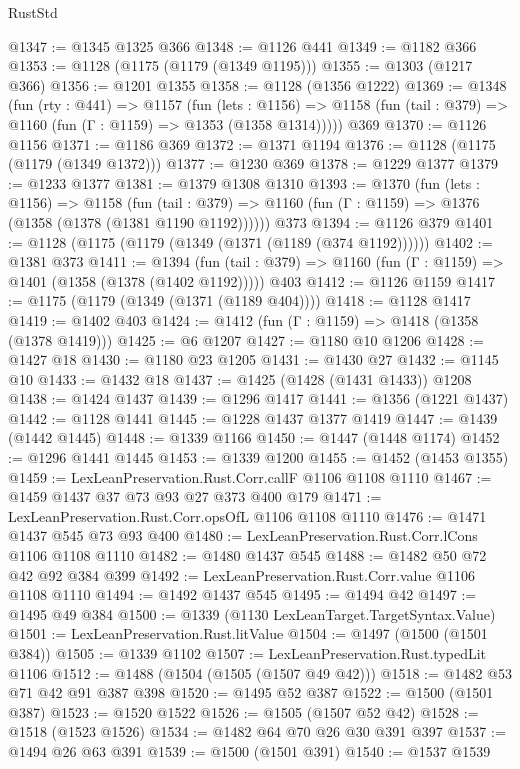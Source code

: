 \begin{lexlean}{RustStd}
\begin{coremodule}
@1347 := @1345 @1325 @366
@1348 := @1126 @441
@1349 := @1182 @366
@1353 := @1128 (@1175 (@1179 (@1349 @1195)))
@1355 := @1303 (@1217 @366)
@1356 := @1201 @1355
@1358 := @1128 (@1356 @1222)
@1369 := @1348
    (fun (rty : @441) =>
    @1157
      (fun (lets : @1156) =>
      @1158 (fun (tail : @379) => @1160 (fun (Γ : @1159) => @1353 (@1358 @1314)))))
    @369
@1370 := @1126 @1156
@1371 := @1186 @369
@1372 := @1371 @1194
@1376 := @1128 (@1175 (@1179 (@1349 @1372)))
@1377 := @1230 @369
@1378 := @1229 @1377
@1379 := @1233 @1377
@1381 := @1379 @1308 @1310
@1393 := @1370
    (fun (lets : @1156) =>
    @1158
      (fun (tail : @379) => @1160 (fun (Γ : @1159) => @1376 (@1358 (@1378 (@1381 @1190 @1192))))))
    @373
@1394 := @1126 @379
@1401 := @1128 (@1175 (@1179 (@1349 (@1371 (@1189 (@374 @1192))))))
@1402 := @1381 @373
@1411 := @1394
    (fun (tail : @379) => @1160 (fun (Γ : @1159) => @1401 (@1358 (@1378 (@1402 @1192)))))
    @403
@1412 := @1126 @1159
@1417 := @1175 (@1179 (@1349 (@1371 (@1189 @404))))
@1418 := @1128 @1417
@1419 := @1402 @403
@1424 := @1412 (fun (Γ : @1159) => @1418 (@1358 (@1378 @1419)))
@1425 := @6 @1207
@1427 := @1180 @10 @1206
@1428 := @1427 @18
@1430 := @1180 @23 @1205
@1431 := @1430 @27
@1432 := @1145 @10
@1433 := @1432 @18
@1437 := @1425 (@1428 (@1431 @1433)) @1208
@1438 := @1424 @1437
@1439 := @1296 @1417
@1441 := @1356 (@1221 @1437)
@1442 := @1128 @1441
@1445 := @1228 @1437 @1377 @1419
@1447 := @1439 (@1442 @1445)
@1448 := @1339 @1166
@1450 := @1447 (@1448 @1174)
@1452 := @1296 @1441 @1445
@1453 := @1339 @1200
@1455 := @1452 (@1453 @1355)
@1459 := LexLeanPreservation.Rust.Corr.callF @1106 @1108 @1110
@1467 := @1459 @1437 @37 @73 @93 @27 @373 @400 @179
@1471 := LexLeanPreservation.Rust.Corr.opsOfL @1106 @1108 @1110
@1476 := @1471 @1437 @545 @73 @93 @400
@1480 := LexLeanPreservation.Rust.Corr.lCons @1106 @1108 @1110
@1482 := @1480 @1437 @545
@1488 := @1482 @50 @72 @42 @92 @384 @399
@1492 := LexLeanPreservation.Rust.Corr.value @1106 @1108 @1110
@1494 := @1492 @1437 @545
@1495 := @1494 @42
@1497 := @1495 @49 @384
@1500 := @1339 (@1130 LexLeanTarget.TargetSyntax.Value)
@1501 := LexLeanPreservation.Rust.litValue
@1504 := @1497 (@1500 (@1501 @384))
@1505 := @1339 @1102
@1507 := LexLeanPreservation.Rust.typedLit @1106
@1512 := @1488 (@1504 (@1505 (@1507 @49 @42)))
@1518 := @1482 @53 @71 @42 @91 @387 @398
@1520 := @1495 @52 @387
@1522 := @1500 (@1501 @387)
@1523 := @1520 @1522
@1526 := @1505 (@1507 @52 @42)
@1528 := @1518 (@1523 @1526)
@1534 := @1482 @64 @70 @26 @30 @391 @397
@1537 := @1494 @26 @63 @391
@1539 := @1500 (@1501 @391)
@1540 := @1537 @1539

\end{coremodule}
\end{lexlean}
